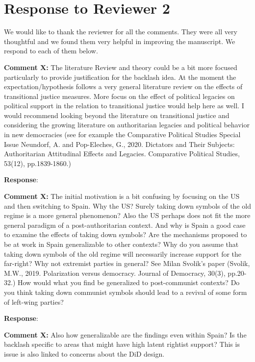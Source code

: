\documentclass[12pt, a4paper, notitlepage]{article}
\begin{document}
\newpage
\section*{Response to Reviewer 2}

We would like to thank the reviewer for all the comments. They were all very thoughtful and we found them very helpful in improving the manuscript. We respond to each of them below.

\textbf{Comment X:} The literature Review and theory could be a bit more focused particularly to provide justification for the backlash idea. At the moment the expectation/hypothesis follows a very general literature review on the effects of transitional justice measures. More focus on the effect of political legacies on political support in the relation to transitional justice would help here as well. I would recommend looking beyond the literature on transitional justice and considering the growing literature on authoritarian legacies and political behavior in new democracies (see for example the Comparative Political Studies Special Issue Neundorf, A. and Pop-Eleches, G., 2020. Dictators and Their Subjects: Authoritarian Attitudinal Effects and Legacies. Comparative Political Studies, 53(12), pp.1839-1860.)

\textbf{Response}: {\color{red}{pending}}

\textbf{Comment X:} The initial motivation is a bit confusing by focusing on the US and then switching to Spain. Why the US? Surely taking down symbols of the old regime is a more general phenomenon? Also the US perhaps does not fit the more general paradigm of a post-authoritarian context. And why is Spain a good case to examine the effects of taking down symbols? Are the mechanisms proposed to be at work in Spain generalizable to other contexts? Why do you assume that taking down symbols of the old regime will necessarily increase support for the far-right? Why not extremist parties in general? See Milan Svolik’s paper (Svolik, M.W., 2019. Polarization versus democracy. Journal of Democracy, 30(3), pp.20-32.) How would what you find be generalized to post-communist contexts? Do you think taking down communist symbols should lead to a revival of some form of left-wing parties?

\textbf{Response}: {\color{red}{pending}}

\textbf{Comment X:} Also how generalizable are the findings even within Spain? Is the backlash specific to areas that might have high latent rightist support? This is issue is also linked to concerns about the DiD design.
\end{document}
